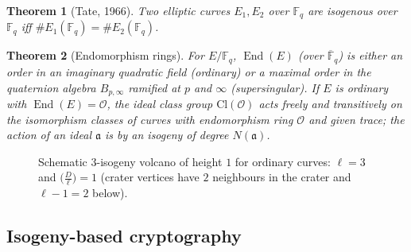 \documentclass[11pt,a4paper,oneside]{book}
\theoremstyle{plain}
\newtheorem{theorem}{Theorem}[chapter]
\theoremstyle{definition}
\theoremstyle{remark}
\newcommand{\Fq}{\mathbb{F}_q}
\newcommand{\Fqbar}{\overline{\mathbb{F}}_q}
\newcommand{\End}{\operatorname{End}}
\begin{document}
\begin{theorem}[Tate, 1966]\label{thm:tate}
Two elliptic curves $E_1,E_2$ over $\Fq$ are isogenous over $\Fq$ iff $\#E_1(\Fq)=\#E_2(\Fq)$.
\end{theorem}

\begin{theorem}[Endomorphism rings]
For $E/\Fq$, $\End(E)$ (over $\Fqbar$) is either an order in an imaginary quadratic field (\emph{ordinary}) or a maximal order in the quaternion algebra $B_{p,\infty}$ ramified at $p$ and $\infty$ (\emph{supersingular}). If $E$ is ordinary with $\End(E)=\mathcal O$, the ideal class group $\mathrm{Cl}(\mathcal O)$ acts freely and transitively on the isomorphism classes of curves with endomorphism ring $\mathcal O$ and given trace; the action of an ideal $\mathfrak a$ is by an isogeny of degree $N(\mathfrak a)$.
\end{theorem}

\begin{figure}[ht]
\centering
{}
\caption{Schematic $3$-isogeny volcano of height $1$ for ordinary curves: $\ell=3$ and $\big(\tfrac D\ell\big)=1$ (crater vertices have $2$ neighbours in the crater and $\ell-1=2$ below).}
\label{fig:volcano}
\end{figure}

\subsection{Isogeny-based cryptography}
\end{document}
